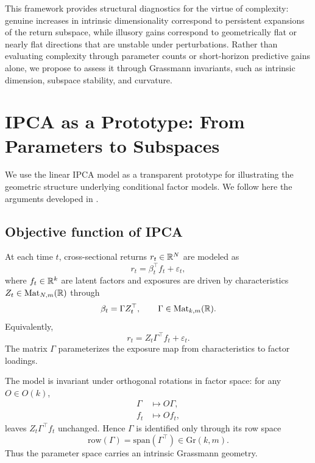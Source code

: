 \documentclass[twoside,11pt,letter]{article}
\begin{document}
This framework provides structural diagnostics for the virtue of complexity: genuine increases in intrinsic dimensionality correspond to persistent expansions of the return subspace, while illusory gains correspond to geometrically flat or nearly flat directions that are unstable under perturbations. Rather than evaluating complexity through parameter counts or short-horizon predictive gains alone, we propose to assess it through Grassmann invariants, such as intrinsic dimension, subspace stability, and curvature.

\section{\label{sec:ipca}IPCA as a Prototype: From Parameters to Subspaces}

We use the linear IPCA model \cite{KPS19} as a transparent prototype for illustrating the geometric structure underlying conditional factor models. We follow here the arguments developed in \cite{LM26}.

\subsection{Objective function of IPCA}

At each time $t$, cross-sectional returns $r_t\in\mathbb{R}^N$ are modeled as
\begin{equation}
r_t = \beta_t^\top f_t + \varepsilon_t,
\end{equation}
where $f_t\in\mathbb{R}^k$ are latent factors and exposures are driven by characteristics $Z_t\in\mathrm{Mat}_{N,m}(\mathbb{R})$ through
\begin{equation}
\beta_t = \Gamma Z_t^\top,
\qquad
\Gamma\in\mathrm{Mat}_{k,m}(\mathbb{R}).
\end{equation}
Equivalently,
\begin{equation}
r_t = Z_t \Gamma^\top f_t + \varepsilon_t.
\end{equation}
The matrix $\Gamma$ parameterizes the exposure map from characteristics to factor loadings.

The model is invariant under orthogonal rotations in factor space: for any $O\in O(k)$,
\begin{equation*}
\begin{split}
\Gamma &\mapsto O\Gamma,\\
f_t &\mapsto Of_t,
\end{split}
\end{equation*}
leaves $Z_t\Gamma^\top f_t$ unchanged. Hence $\Gamma$ is identified only through its row space
\begin{equation*}
\mathrm{row}(\Gamma)=\mathrm{span}(\Gamma^\top) \in\mathrm{Gr}(k,m).
\end{equation*}
Thus the parameter space carries an intrinsic Grassmann geometry.
\end{document}
